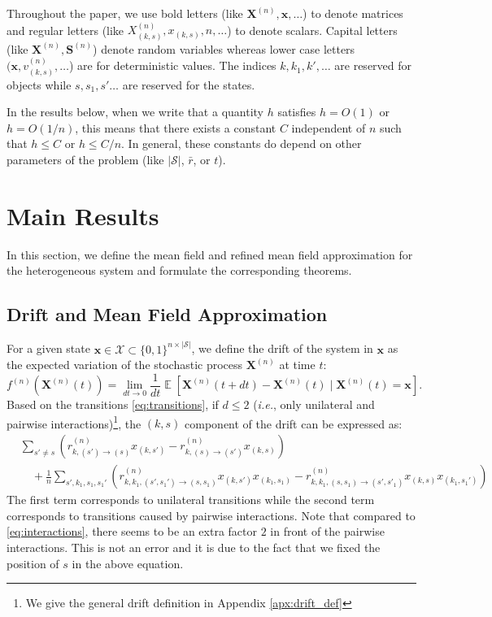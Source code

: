 \documentclass[acmsmall]{acmart}
\newcommand\bx{\mathbf{x}}
\newcommand\bS{\mathbf{S}}
\newcommand\bX{\mathbf{X}}
\newcommand\bdrift{f}
\newcommand\calX{\mathcal{X}}
\newcommand\calS{\mathcal{S}}
\newcommand\toN{^{(n)}}
\newcommand\ns{n\times|\calS|} %
\DeclareMathOperator{\E}{\mathbb{E}} %
\newcommand\esp[1]{\E\left[#1\right]} %
\begin{document}
Throughout the paper, we use bold letters (like $\bX\toN,\bx,\hdots$) to denote matrices and regular letters (like $X_{(k,s)}\toN,x_{(k,s)},n,\hdots$) to denote scalars. Capital letters (like $\bX\toN, \bS\toN$) denote random variables whereas lower case letters $(\bx,v_{(k,s)}\toN,\hdots$) are for deterministic values. The indices $k,k_1,k',\hdots$ are reserved for objects while $s,s_1,s'\hdots$ are reserved for the states. 

In the results below, when we write that a quantity $h$ satisfies $h = O(1)$ or $h=O(1/n)$, this means that there exists a constant $C$ independent of $n$ such that $h\le C$ or $h\le C/n$. In general, these constants do depend on other parameters of the problem (like $|\calS|$, $\bar{r}$, or $t$).





\section{Main Results}
\label{sec:main_results}


In this section, we define the mean field and refined mean field approximation for the heterogeneous system and formulate the corresponding theorems.

\subsection{Drift and Mean Field Approximation}
\label{ssec:drift_mean_field}


For a given state $\bx\in\calX\subset \{0,1\}^{\ns}$, we define the drift of the system in $\bx$ as the expected variation of the stochastic process $\bX\toN$ at time $t$: $$\bdrift\toN(\bX\toN(t))=\lim_{dt\to0}\frac{1}{dt}\esp{\bX\toN(t+dt)-\bX\toN(t) \mid \bX\toN(t)=\bx}.$$ \color{myorange} Based on the transitions \eqref{eq:transitions}, if $d\le 2$ (\emph{i.e.}, only unilateral and pairwise interactions)\footnote{We give the general drift definition in Appendix \ref{apx:drift_def}}, the $(k,s)$ component of the drift can be expressed as: 
\begin{align}
  & \sum_{s' \ne s} (r\toN_{k,(s') \rightarrow (s)} x_{(k,s')} - r\toN_{k,(s) \rightarrow (s')} x_{(k,s)})  \label{eq:drift}\\
  & \quad + \frac1n \sum_{s',k_1, s_1,s_1'} (r\toN_{k,k_1,(s',s_1')\rightarrow (s,s_1)} x_{(k,s')}x_{(k_1,s_1)} - r\toN_{k,k_1,(s,s_1) \rightarrow (s',s'_1)} x_{(k,s)}x_{(k_1,s_1')}) 
  \nonumber
\end{align} 
The first term corresponds to unilateral transitions while the second term corresponds to transitions caused by pairwise interactions. Note that compared to \eqref{eq:interactions}, there seems to be an extra factor $2$ in front of the pairwise interactions. This is not an error and it is due to the fact that we fixed the position of $s$ in the above equation.
\end{document}

